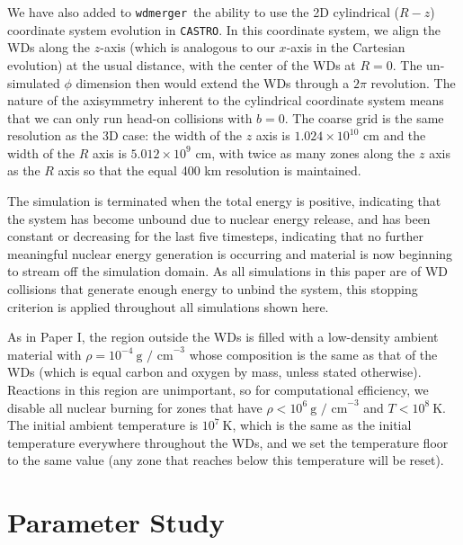 \documentclass[twocolumn,numberedappendix]{../aastex6}
\newcommand{\castro}{\texttt{CASTRO}}
\newcommand{\wdmerger}{\texttt{wdmerger}}
\begin{document}
We have also added to \wdmerger\ the ability to use the 2D cylindrical ($R-z$)
coordinate system evolution in \castro. In this coordinate system, we align
the WDs along the $z$-axis (which is analogous to our $x$-axis in the Cartesian
evolution) at the usual distance, with the center of the WDs at $R = 0$. The
un-simulated $\phi$ dimension then would extend the WDs through a $2\pi$ revolution.
The nature of the axisymmetry inherent to the cylindrical coordinate system
means that we can only run head-on collisions with $b = 0$. The coarse grid
is the same resolution as the 3D case: the width of the $z$ axis is $1.024 \times 10^{10}$
cm and the width of the $R$ axis is $5.012 \times 10^{9}$ cm, with twice as
many zones along the $z$ axis as the $R$ axis so that the equal 400 km
resolution is maintained.

The simulation is terminated when the total energy is positive, indicating that
the system has become unbound due to nuclear energy release, and has been
constant or decreasing for the last five timesteps, indicating that no further
meaningful nuclear energy generation is occurring and material is now beginning
to stream off the simulation domain. As all simulations in this paper are of
WD collisions that generate enough energy to unbind the system, this stopping
criterion is applied throughout all simulations shown here.

As in Paper I, the region outside the WDs is filled with a low-density ambient
material with $\rho = 10^{-4}\ \text{g / cm}^{-3}$ whose composition is the
same as that of the WDs (which is equal carbon and oxygen by mass, unless
stated otherwise). Reactions in this region are unimportant, so for
computational efficiency, we disable all nuclear burning for zones that have
$\rho < 10^6\ \text{g / cm}^{-3}$ and $T < 10^8\ \text{K}$. The initial ambient
temperature is $10^7\ \text{K}$, which is the same as the initial temperature
everywhere throughout the WDs, and we set the temperature floor to the same
value (any zone that reaches below this temperature will be reset).



\section{Parameter Study}
\label{sec:parameters}
\end{document}
